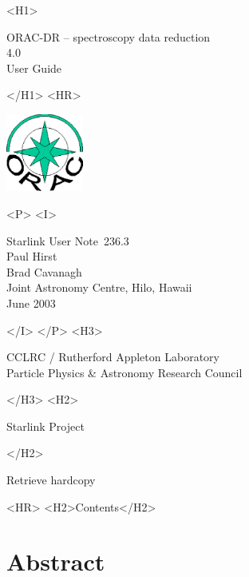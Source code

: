 \documentclass[twoside,11pt]{article}
\newcommand{\stardoccategory}  {Starlink User Note}
\newcommand{\stardocsource}    {sun\stardocnumber}
\newcommand{\stardocnumber}    {236.3}
\newcommand{\stardocauthors}   {Paul Hirst \\ Brad Cavanagh \\
                                Joint Astronomy Centre, Hilo, Hawaii}
\newcommand{\stardocdate}      {June 2003}
\newcommand{\stardoctitle}     {ORAC-DR -- spectroscopy data reduction}
\newcommand{\stardocversion}   {4.0}
\newcommand{\stardocmanual}    {User Guide}
\newcommand{\htmladdnormallink}[2]{#1}
\newcommand{\htmladdimg}[1]{}
\newcommand{\htmlref}[2]{#1}
\newcommand{\htmladdtonavigation}[1]{}
\newcommand{\xlabel}[1]{}
\renewcommand{\_}{\texttt{\symbol{95}}}
\begin{document}
\begin{htmlonly}
   \xlabel{}
   \begin{rawhtml} <H1> \end{rawhtml}
      \stardoctitle\\
      \stardocversion\\
      \stardocmanual
   \begin{rawhtml} </H1> <HR> \end{rawhtml}

\includegraphics[width=1.0in]{sun236_logo.eps}

   \begin{rawhtml} <P> <I> \end{rawhtml}
   \stardoccategory\ \stardocnumber \\
   \stardocauthors \\
   \stardocdate
   \begin{rawhtml} </I> </P> <H3> \end{rawhtml}
      \htmladdnormallink{CCLRC / Rutherford Appleton Laboratory}
                        {http://www.cclrc.ac.uk} \\
      \htmladdnormallink{Particle Physics \& Astronomy Research Council}
                        {http://www.pparc.ac.uk} \\
   \begin{rawhtml} </H3> <H2> \end{rawhtml}
      \htmladdnormallink{Starlink Project}{http://www.starlink.rl.ac.uk/}
   \begin{rawhtml} </H2> \end{rawhtml}
   \htmladdnormallink{\htmladdimg{source.gif} Retrieve hardcopy}
      {http://www.starlink.rl.ac.uk/cgi-bin/hcserver?\stardocsource}\\

  \label{stardoccontents}
  \begin{rawhtml} 
    <HR>
    <H2>Contents</H2>
  \end{rawhtml}
  \htmladdtonavigation{\htmlref{\htmladdimg{contents_motif.gif}}
        {stardoccontents}}

  \section{\xlabel{abstract}Abstract}
\end{htmlonly}
\end{document}
